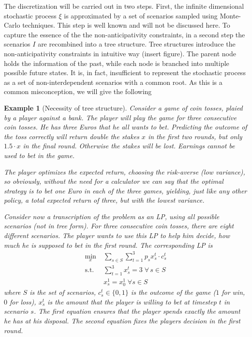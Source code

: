 \documentclass[a4paper, 12pt] {article}
\newtheorem*{example}{Example}
\begin{document}
The discretization will be carried out in two steps. First, the infinite dimensional stochastic process $\xi$ is approximated by a set of scenarios sampled using Monte-Carlo techniques. This step is well known and will not be discussed here. To capture the essence of the the non-anticipativity constraints, in a second step the scenarios $I$ are recombined into a tree structure. Tree structures introduce the non-anticipativity constraints in intuitive way (insert figure). The parent node holds the information of the past, while each node is branched into multiple possible future states. It is, in fact, insufficient to represent the stochastic process as a set of non-interdependent scenarios with a common root. As this is a common misconception, we will give the following
\begin{example}[Necessity of tree structure]
Consider a game of coin tosses, plaied by a player against a bank. The player will play the game for three consecutive coin tosses. He has three Euros that he all wants to bet. Predicting the outcome of the toss correctly will return double the stakes $x$ in the first two rounds, but only $1.5\cdot x$ in the final round. Otherwise the stakes will be lost. Earnings cannot be used to bet in the game.

The player optimizes the expected return, choosing the risk-averse  (low variance), so obviously, without the need for a calculator we can say that the optimal strategy is to bet one Euro in each of the three games, yielding, just like any other policy, a total expected return of three, but with the lowest variance. 

Consider now a transcription of the problem as an LP, using all possible scenarios (not in tree form). For three consecutive coin tosses, there are eight different scenarios. The player wants to use this LP to help him decide, how much he is supposed to bet in the first round. The corresponding LP is
\begin{align*}
  \min\limits_x &\; \sum_{s\in S}\sum_{t=1}^3p_sx_s^t\cdot c_s^t\\
  \text{s.t.} &\; \sum_{t=1}^3x_s^t = 3 \;\forall\, s\in S\\
  & \; x_s^1 = x_0^1\;\forall s\in S
\end{align*}
where $S$ is the set of scenarios, $c_s^t\in \{0,1\}$ is the outcome of the game ($1$ for win, $0$ for loss), $x_s^t$ is the amount that the player is willing to bet at timestep $t$ in scenario $s$. The first equation ensures that the player spends exactly the amount he has at his disposal. The second equation fixes the players decision in the first round.


\end{example}
\end{document}
